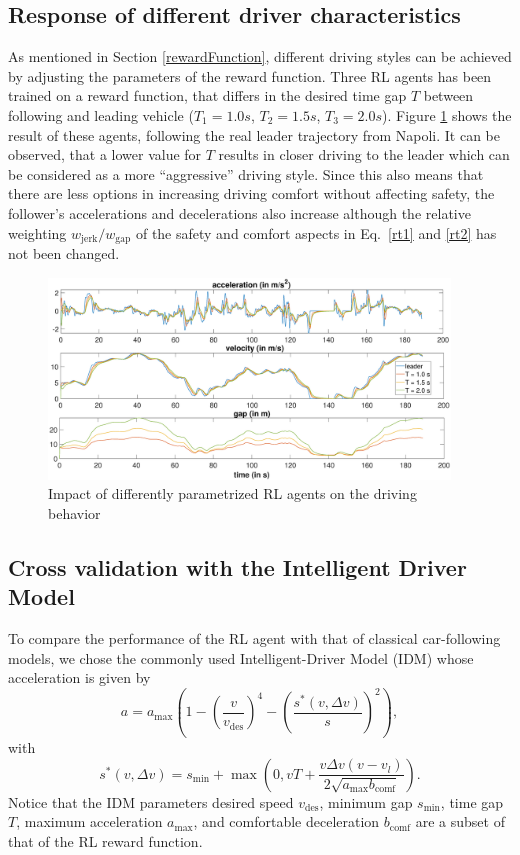 \documentclass[review]{elsarticle}
\providecommand{\sub}[1]{_{\mathrm{#1}}}  %
\providecommand{\3}{{\ss}}
\begin{document}
\subsection{Response of different driver characteristics}
\label{sec:differentT}

As mentioned in Section \ref{rewardFunction}, different driving styles
can be achieved by adjusting the parameters of the reward
function. Three RL agents has been trained on a reward function, that
differs in the desired time gap $T$ between following and
leading vehicle ($T_{1} = 1.0s$, $T_{2} = 1.5s$, $T_{3} =
2.0s$). Figure \ref{fig:differentT} shows the result of these agents,
following the real leader trajectory from Napoli. It can be observed,
that a lower value for $T$ results in closer driving to the
leader which can be considered as a more ``aggressive''
driving style. Since this also means that there are less options in
increasing driving comfort without affecting safety, the follower's
accelerations and decelerations also increase although the relative
weighting $w\sub{jerk}/w\sub{gap}$ of the safety and comfort aspects in Eq.~\eqref{rt1} and \eqref{rt2} has not been
changed.

\begin{figure}
	\centering
	\includegraphics[width=0.95\textwidth]{images/differentT}
	\caption{Impact of differently parametrized RL agents
          on the driving behavior }
	\label{fig:differentT}
\end{figure}


\subsection{Cross validation with the Intelligent Driver Model}
To compare the performance of the RL agent with that of
classical car-following models, we chose the commonly used
Intelligent-Driver Model (IDM)\cite{Opus} whose acceleration is given
by
\begin{equation}
\label{eq:IDM}
a=a\sub{max}\left(1-\left(\frac{v}{v\sub{des}}\right)^{4}-\left(\frac{s^{*}\left(v, \Delta v\right)}{s}\right)^{2}\right),
\end{equation}
with
\begin{equation}
\label{eq:IDMsstar}
s^{*}\left(v, \Delta v\right)=s\sub{min}+\max \left(0,vT+\frac{v \Delta v(v-v_l)}{2 \sqrt{a\sub{max} b\sub{comf}}}\right).
\end{equation}
Notice that the IDM parameters desired
speed $v\sub{des}$, minimum gap $s\sub{min}$, time gap $T$, maximum
acceleration $a\sub{max}$, and
comfortable deceleration $b\sub{comf}$ are a subset of that of the RL reward
function. 
\end{document}
